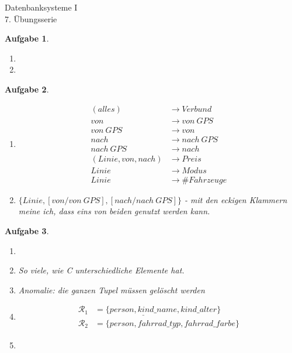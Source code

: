 \documentclass[11pt]{article}
\theoremstyle{break}
\newtheorem{task}{Aufgabe}
\newcommand{\set}[1]{\ensuremath{\{#1\}}}
\begin{document}
\begin{center}
\Large{Datenbanksysteme I}\\
\large{7. Übungsserie}
\end{center}
\begin{task}
    \hfill\vspace{-5mm}
    \begin{enumerate}[label={(\alph*)}]
        \item \hfill
        \item \hfill
    \end{enumerate}
\end{task}

\begin{task}
    \hfill\vspace{-5mm}
    \begin{enumerate}[label={(\alph*)}]
        \item \begin{align*}
            (alles) &\rightarrow Verbund\\
            von &\rightarrow von\ GPS\\
            von\ GPS &\rightarrow von\\
            nach &\rightarrow nach\ GPS\\
            nach\ GPS &\rightarrow nach\\
            (Linie, von, nach) &\rightarrow Preis\\
            Linie &\rightarrow Modus\\
            Linie &\rightarrow \#Fahrzeuge
        \end{align*}
        \item $\set{Linie, [von / von\ GPS], [nach / nach\ GPS]}$ - mit den eckigen Klammern meine ich, dass eins von beiden genutzt werden kann.
    \end{enumerate}
\end{task}

\begin{task}
    \hfill\vspace{-5mm}
    \begin{enumerate}[label={(\alph*)}]
        \item \hfill
        \item So viele, wie C unterschiedliche Elemente hat.
        \item Anomalie: die ganzen Tupel müssen gelöscht werden
        \item \begin{align*}
            \mathcal{R}_1 &= \set{\underline{person, kind\_name}, kind\_alter}\\
            \mathcal{R}_2 &= \set{\underline{person, fahrrad\_typ, fahrrad\_farbe}}
        \end{align*}
        \item \hfill
    \end{enumerate}
\end{task}
\end{document}
